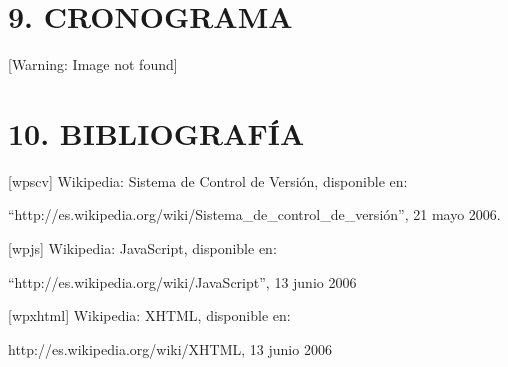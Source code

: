 \documentclass[12pt,letterpaper,oneside]{article}
\begin{document}
\bigskip


\bigskip


\bigskip


\bigskip


\bigskip


\bigskip


\bigskip


\bigskip


\bigskip


\bigskip


\bigskip


\bigskip


\bigskip

\section{9. CRONOGRAMA}

\bigskip



\begin{center}
[Warning: Image not found]
\end{center}

\bigskip


\bigskip


\bigskip


\bigskip


\bigskip


\bigskip


\bigskip


\bigskip


\bigskip

\section{10. BIBLIOGRAF\'IA}

\bigskip

[wpscv] Wikipedia: Sistema de Control de Versión, disponible en:

``http://es.wikipedia.org/wiki/Sistema\_de\_control\_de\_versión'', 21
mayo 2006.


\bigskip

[wpjs] Wikipedia: JavaScript, disponible en:

``http://es.wikipedia.org/wiki/JavaScript'', 13 junio 2006


\bigskip

[wpxhtml] Wikipedia: XHTML, disponible en:

{\textquotedbl}http://es.wikipedia.org/wiki/XHTML{\textquotedbl}, 13
junio 2006
\end{document}
